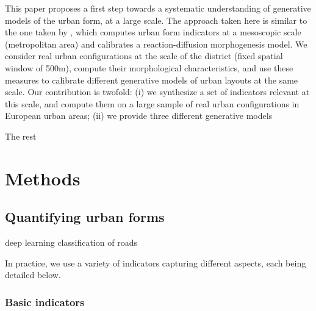 \documentclass[letterpaper]{article}
\begin{document}



This paper proposes a first step towards a systematic understanding of generative models of the urban form, at a large scale. The approach taken here is similar to the one taken by \cite{raimbault2018calibration}, which computes urban form indicators at a mesoscopic scale (metropolitan area) and calibrates a reaction-diffusion morphogenesis model. We consider real urban configurations at the scale of the district (fixed spatial window of 500m), compute their morphological characteristics, and use these measures to calibrate different generative models of urban layouts at the same scale. Our contribution is twofold: (i) we synthesize a set of indicators relevant at this scale, and compute them on a large sample of real urban configurations in European urban areas; (ii) we provide three different generative models

The rest


\section{Methods}

\subsection{Quantifying urban forms}


\cite{2017arXiv170902939M} deep learning classification of roads

\citep{webster1995urban}



In practice, we use a variety of indicators capturing different aspects, each being detailed below.


\subsubsection{Basic indicators}
\end{document}
